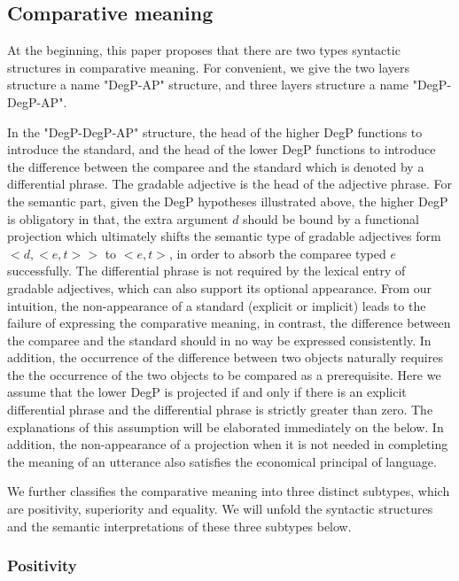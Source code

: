\documentclass{ctexart}
\begin{document}
\subsection{Comparative meaning}

At the beginning, this paper proposes that there are two types syntactic structures in comparative meaning. For convenient, we give the two layers structure a name "DegP-AP" structure, and three layers structure a name "DegP-DegP-AP". 

In the "DegP-DegP-AP" structure, the head of the higher DegP functions to introduce the standard, and the head of the lower DegP functions to introduce the difference between the comparee and the standard which is denoted by a differential phrase. The gradable adjective is the head of the adjective phrase. For the semantic part, given the DegP hypotheses illustrated above, the higher DegP is obligatory in that, the extra argument $d$ should be bound by a functional projection which ultimately shifts the semantic type of gradable adjectives form $<d,<e,t>>$ to $<e,t>$, in order to absorb the comparee typed $e$ successfully. The differential phrase is not required by the lexical entry of gradable adjectives, which can also support its optional appearance. From our intuition, the non-appearance of a standard (explicit or implicit) leads to the failure of expressing the comparative meaning, in contrast, the difference between the comparee and the standard should in no way be expressed consistently. In addition, the occurrence of the difference between two objects naturally requires the the occurrence of the two objects to be compared as a prerequisite. Here we assume that the lower DegP is projected if and only if there is an explicit differential phrase and the differential phrase is strictly greater than zero. The explanations of this assumption will be elaborated immediately on the below. In addition, the non-appearance of a projection when it is not needed in completing the meaning of an utterance also satisfies the economical principal of language.

We further classifies the comparative meaning into three distinct subtypes, which are positivity, superiority and equality. We will unfold the syntactic structures and the semantic interpretations of these three subtypes below.

\subsubsection{Positivity}
\end{document}
